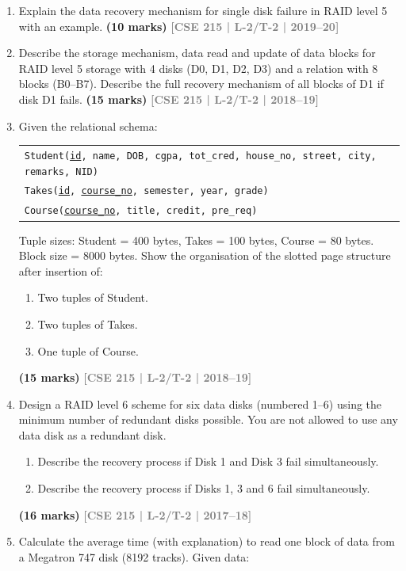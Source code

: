 \documentclass[12pt]{article}
\newcommand{\yr}[1]{\hfill\textcolor{gray}{\small\textbf{[#1]}}}
\newcommand{\mk}[1]{\textcolor{orange!70!black}{\small\textbf{(#1 marks)}}}
\begin{document}
\begin{enumerate}
\item Explain the data recovery mechanism for single disk failure in RAID level 5 with an example.
\mk{10} \yr{CSE 215 | L-2/T-2 | 2019--20}


\item Describe the storage mechanism, data read and update of data blocks for RAID level 5 storage with 4 disks (D0, D1, D2, D3) and a relation with 8 blocks (B0--B7). Describe the full recovery mechanism of all blocks of D1 if disk D1 fails.
\mk{15} \yr{CSE 215 | L-2/T-2 | 2018--19}


\item Given the relational schema:
\begin{center}
\begin{tabular}{l}
\texttt{Student(\underline{id}, name, DOB, cgpa, tot\_cred, house\_no, street, city, remarks, NID)}\\
\texttt{Takes(\underline{id}, \underline{course\_no}, semester, year, grade)}\\
\texttt{Course(\underline{course\_no}, title, credit, pre\_req)}
\end{tabular}
\end{center}
Tuple sizes: Student = 400 bytes, Takes = 100 bytes, Course = 80 bytes. Block size = 8000 bytes. Show the organisation of the slotted page structure after insertion of:
\begin{enumerate}
  \item Two tuples of Student.
  \item Two tuples of Takes.
  \item One tuple of Course.
\end{enumerate}
\mk{15} \yr{CSE 215 | L-2/T-2 | 2018--19}


\item Design a RAID level 6 scheme for six data disks (numbered 1--6) using the minimum number of redundant disks possible. You are not allowed to use any data disk as a redundant disk.
\begin{enumerate}
  \item Describe the recovery process if Disk 1 and Disk 3 fail simultaneously.
  \item Describe the recovery process if Disks 1, 3 and 6 fail simultaneously.
\end{enumerate}
\mk{16} \yr{CSE 215 | L-2/T-2 | 2017--18}


\item Calculate the average time (with explanation) to read one block of data from a Megatron 747 disk (8192 tracks). Given data:


\end{enumerate}
\end{document}
